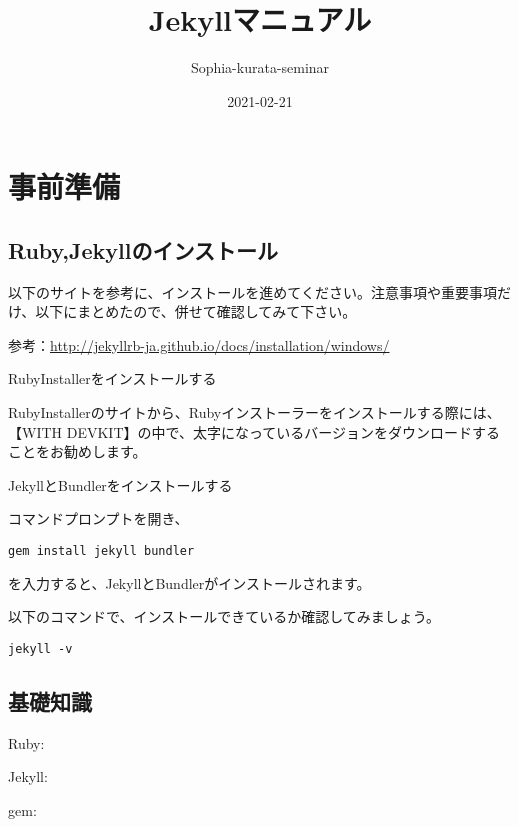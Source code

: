 \documentclass[
]{book}
\title{Jekyllマニュアル}
\author{Sophia-kurata-seminar}
\date{2021-02-21}
\begin{document}
\maketitle

{
\setcounter{tocdepth}{1}
\tableofcontents
}
\hypertarget{ux4e8bux524dux6e96ux5099}{%
\chapter*{事前準備}\label{ux4e8bux524dux6e96ux5099}}

\hypertarget{rubyjekyllux306eux30a4ux30f3ux30b9ux30c8ux30fcux30eb}{%
\section{Ruby,Jekyllのインストール}\label{rubyjekyllux306eux30a4ux30f3ux30b9ux30c8ux30fcux30eb}}

以下のサイトを参考に、インストールを進めてください。注意事項や重要事項だけ、以下にまとめたので、併せて確認してみて下さい。

参考：\url{http://jekyllrb-ja.github.io/docs/installation/windows/}

RubyInstallerをインストールする

RubyInstallerのサイトから、Rubyインストーラーをインストールする際には、【WITH DEVKIT】の中で、太字になっているバージョンをダウンロードすることをお勧めします。

JekyllとBundlerをインストールする

コマンドプロンプトを開き、

\begin{verbatim}
gem install jekyll bundler
\end{verbatim}

を入力すると、JekyllとBundlerがインストールされます。

以下のコマンドで、インストールできているか確認してみましょう。

\begin{verbatim}
jekyll -v
\end{verbatim}

\hypertarget{ux57faux790eux77e5ux8b58}{%
\section{基礎知識}\label{ux57faux790eux77e5ux8b58}}

Ruby:

Jekyll:

gem:
\end{document}
